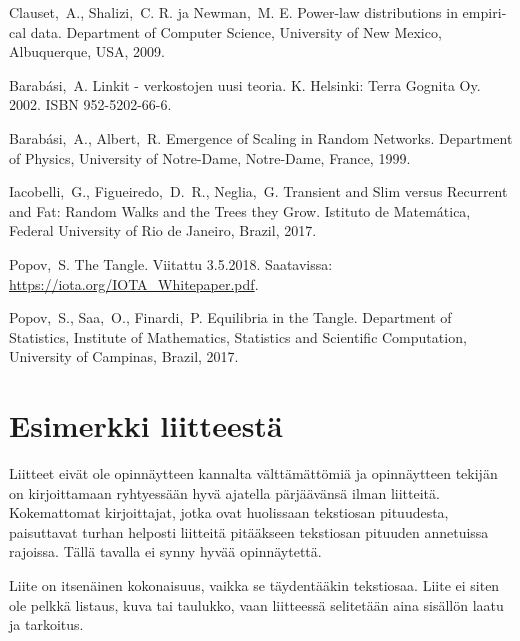 \documentclass[finnish, 12pt, a4paper, sci, utf8, pdfa]{aaltothesis}
\begin{document}
\begin{thebibliography}{99}

 Clauset,\ A., Shalizi,\ C. R. ja Newman,\ M. E. 
   \foreignlanguage{english}{Power-law distributions in empirical data.} 
   Department of Computer Science, University of New Mexico, Albuquerque, USA, 2009.

 Barabási,\ A. Linkit - verkostojen uusi teoria. 
   K. Helsinki: Terra Gognita Oy. 2002. ISBN 952-5202-66-6. 

 Barabási,\ A., Albert,\ R.
   \foreignlanguage{english}{Emergence of Scaling in Random Networks.} 
   Department of Physics, University of Notre-Dame, Notre-Dame, France, 1999.

 Iacobelli,\ G., Figueiredo,\ D.\ R., Neglia,\ G. 
   \foreignlanguage{english}{Transient and Slim versus Recurrent and Fat: Random Walks and the Trees they Grow.} 
   Istituto de Matemática, Federal University of Rio de Janeiro, Brazil, 2017.

 Popov,\ S. The Tangle. Viitattu 3.5.2018. Saatavissa: \url{https://iota.org/IOTA_Whitepaper.pdf}.

 Popov,\ S., Saa,\ O., Finardi,\ P. 
   \foreignlanguage{english}{Equilibria in the Tangle.} 
   Department of Statistics, Institute of Mathematics, Statistics and Scientific Computation, University of Campinas, Brazil, 2017.

\end{thebibliography}

\clearpage

\thesisappendix

\section{Esimerkki liitteestä\label{LiiteA}}

Liitteet eivät ole opinnäytteen kannalta välttämättömiä ja 
opinnäytteen tekijän on 
kirjoittamaan ryhtyessään hyvä ajatella pärjäävänsä ilman liitteitä.
Kokemattomat kirjoittajat, jotka ovat huolissaan
tekstiosan pituudesta, paisuttavat turhan 
helposti liitteitä pitääkseen tekstiosan pituuden annetuissa rajoissa.
Tällä tavalla ei synny hyvää opinnäytettä.   

Liite on itsenäinen kokonaisuus, vaikka se täydentääkin tekstiosaa.
Liite ei siten ole pelkkä listaus, kuva tai taulukko, vaan 
liitteessä selitetään aina sisällön laatu ja tarkoitus. 
\end{document}
